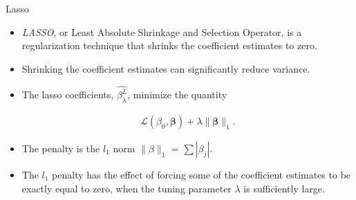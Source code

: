 \documentclass[8pt]{beamer}
\newcommand{\mydef}[1]{\textcolor{SteelBlue3}{\textit{#1}}} %
\begin{document}
\begin{frame}{Lasso}
\begin{itemize}
    \item \mydef{LASSO}, or Least Absolute Shrinkage and Selection Operator, is a regularization technique that shrinks the coefficient estimates to zero.

    \item Shrinking the coefficient estimates can significantly reduce variance. 
    
    \item The lasso coefficients, $\hat{\beta_{\lambda}^{L}}$, minimize the quantity 
    
    \begin{align}
    \label{lasso}
         \mathcal{L}(\beta_{0},\bm{\beta}) + \lambda \| \bm{\beta} \|_{1}.
    \end{align}
    
    \item The penalty is the $l_{1}$ norm $\|\beta\|_{1}$ = $\sum|\beta_{j}|$. 
    \item The $l_{1}$ penalty has the effect of forcing some of the coefficient estimates to be exactly equal to zero, when the tuning parameter $\lambda$ is sufficiently large.

\end{itemize}

\end{frame}
\end{document}
